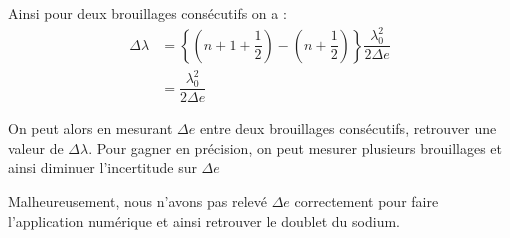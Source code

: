 \documentclass[12pt,a4paper]{article}
\begin{document}
	Ainsi pour deux brouillages consécutifs on a :
	\begin{align*}
	\Delta \lambda  & = \left\lbrace (n+1+\dfrac{1}{2})-(n+\dfrac{1}{2})\right\rbrace \dfrac{\lambda_{0}^{2}}{2\Delta e}\\
	& = \dfrac{\lambda_{0}^{2}}{2\Delta e}
	\end{align*}
	
	On peut alors en mesurant $\Delta e$ entre deux brouillages consécutifs, retrouver une valeur de $\Delta\lambda$. Pour gagner en précision, on peut mesurer plusieurs brouillages et ainsi diminuer l'incertitude sur $\Delta e$
	
	Malheureusement, nous n'avons pas relevé $\Delta e$ correctement pour faire l'application numérique et ainsi retrouver le doublet du sodium.
\end{document}
